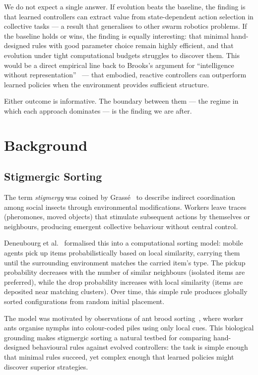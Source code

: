\documentclass[11pt,a4paper]{article}
\begin{document}
We do not expect a single answer. If evolution beats the baseline, the finding is that learned controllers can extract value from state-dependent action selection in collective tasks --- a result that generalises to other swarm robotics problems. If the baseline holds or wins, the finding is equally interesting: that minimal hand-designed rules with good parameter choice remain highly efficient, and that evolution under tight computational budgets struggles to discover them. This would be a direct empirical line back to Brooks's argument for ``intelligence without representation''~\cite{brooks1991} --- that embodied, reactive controllers can outperform learned policies when the environment provides sufficient structure.

Either outcome is informative. The boundary between them --- the regime in which each approach dominates --- is the finding we are after.

\section{Background}
\label{sec:background}

\subsection{Stigmergic Sorting}
The term \emph{stigmergy} was coined by Grass\'e~\cite{grasse1959} to describe indirect coordination among social insects through environmental modifications. Workers leave traces (pheromones, moved objects) that stimulate subsequent actions by themselves or neighbours, producing emergent collective behaviour without central control.

Deneubourg et al.~\cite{deneubourg1990} formalised this into a computational sorting model: mobile agents pick up items probabilistically based on local similarity, carrying them until the surrounding environment matches the carried item's type. The pickup probability decreases with the number of similar neighbours (isolated items are preferred), while the drop probability increases with local similarity (items are deposited near matching clusters). Over time, this simple rule produces globally sorted configurations from random initial placement.

The model was motivated by observations of ant brood sorting~\cite{franks1992}, where worker ants organise nymphs into colour-coded piles using only local cues. This biological grounding makes stigmergic sorting a natural testbed for comparing hand-designed behavioural rules against evolved controllers: the task is simple enough that minimal rules succeed, yet complex enough that learned policies might discover superior strategies.
\end{document}
